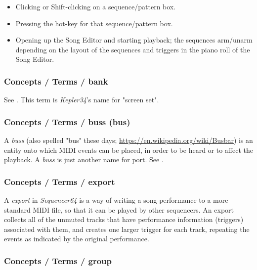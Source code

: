    \begin{itemize}
      \item Clicking or Shift-clicking on a sequence/pattern box.
      \item Pressing the hot-key for that sequence/pattern box.
      \item Opening up the Song Editor and starting playback; the
            sequences arm/unarm depending on the layout of the
            sequences and triggers in the piano roll of the Song Editor.
   \end{itemize}

\subsubsection{Concepts / Terms / bank}
\label{subsubsec:concepts_terms_bank}

   See .
   This term is \textsl{Kepler34}'s name for "screen set".

\subsubsection{Concepts / Terms / buss (bus)}
\label{subsubsec:concepts_terms_buss}

   A \textsl{buss} (also spelled "bus" these days;
   \url{https://en.wikipedia.org/wiki/Busbar}) is an entity onto which
   MIDI events can be placed, in order to be heard or to affect the
   playback.
   A \textsl{buss} is just another name for port.
   See .

\subsubsection{Concepts / Terms / export}
\label{subsubsec:concepts_terms_export}

   A \textsl{export} in \textsl{Sequencer64} is a way of writing a
   song-performance to a more standard MIDI file, so that it can be played
   by other sequencers.  An export collects all of the unmuted tracks that have
   performance information (triggers) associated with them, and creates one
   larger trigger for each track, repeating the events as indicated by the
   original performance.

\subsubsection{Concepts / Terms / group}
\label{subsubsec:concepts_terms_group}

